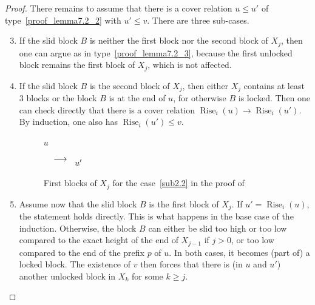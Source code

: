 \documentclass[10pt]{article}
\theoremstyle{definition}
\DeclareMathOperator{\rise}{Rise}
\begin{document}
\begin{proof}
  There remains to assume that there is a cover relation $u \leq u'$
  of type~\eqref{proof_lemma7.2_2} with $u' \leq v$. There are three sub-cases.

  \begin{enumerate}
%
\setcounter{enumi}{2}
\item\label{sub2.3} 
  If the slid block $B$ is neither the
  first block nor the second block of $X_j$, then one can argue as in
  type~\eqref{proof_lemma7.2_3}, because the first unlocked block remains the
  first block of $X_j$, which is not affected.

\setcounter{enumi}{1}
\item\label{sub2.2} 
%
If the slid block $B$ is the second block of $X_j$, then either
  $X_j$ contains at least~$3$ blocks or the block $B$ is at the end of
  $u$, for otherwise $B$ is locked.  Then one can
  check directly that there is a cover relation
  $\rise_i(u) \to \rise_i(u')$. By induction, one also has $\rise_i(u') \leq v$.

  \begin{figure}[htb]
    \centering
    $u$$\quad\phantom{\longrightarrow}\put(-15,5){$\longrightarrow$} \quad u'$
    \caption{First blocks of $X_j$ for the case~\ref{sub2.2} in the proof of }
    \label{cas2.2}
  \end{figure}

\setcounter{enumi}{0}
\item\label{sub2.1} 
%
Assume now that the slid block $B$ is the first block of
  $X_j$. If $u' = \rise_i(u)$, the statement holds directly. This is
  what happens in the base case of the induction. Otherwise, the block
  $B$ can either be slid too high or too low compared to the exact
  height of the end of $X_{j-1}$ if $j > 0$, or too low compared to the end of the
  prefix $p$ of $u$. In both cases, it becomes (part of) a locked
  block. The existence of $v$ then forces that there is (in $u$ and $u'$) another
  unlocked block in $X_k$ for some $k \geq j$.


\end{enumerate}
\end{proof}
\end{document}
